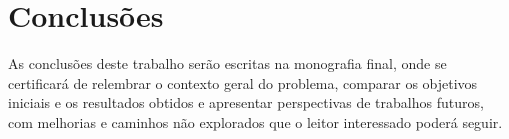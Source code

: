 \chapter{Conclusões}
\label{cap:conclusoes}

    As conclusões deste trabalho serão escritas na monografia final, onde se certificará de relembrar o contexto geral do problema, comparar os objetivos iniciais e os resultados obtidos e apresentar perspectivas de trabalhos futuros, com melhorias e caminhos não explorados que o leitor interessado poderá seguir.